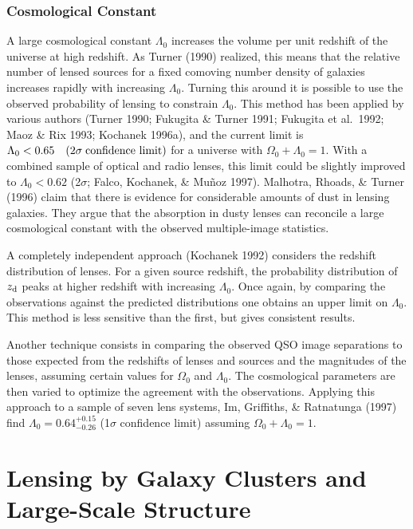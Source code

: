 \documentclass[a4paper,10pt]{article} %
\begin{document}
\subsubsection{Cosmological Constant}
\label{NB:subsubsect3.7.5}

A large cosmological constant $\Lambda_0$ increases the volume per
unit redshift of the universe at high redshift. As Turner (1990)
realized, this means that the relative number of lensed sources for a
fixed comoving number density of galaxies increases rapidly with
increasing $\Lambda_0$. Turning this around it is possible to use the
observed probability of lensing to constrain $\Lambda_0$. This method
has been applied by various authors (Turner 1990; Fukugita \& Turner
1991; Fukugita et al.\ 1992; Maoz \& Rix 1993; Kochanek 1996a), and
the current limit is $\Lambda_0<0.65\quad(2\sigma\;\hbox{confidence
limit})$ for a universe with $\Omega_0+\Lambda_0=1$. With a combined
sample of optical and radio lenses, this limit could be slightly
improved to $\Lambda_0<0.62$ (2$\sigma$; Falco, Kochanek, \& Mu\~noz
1997). Malhotra, Rhoads, \& Turner (1996) claim that there is evidence
for considerable amounts of dust in lensing galaxies. They argue that
the absorption in dusty lenses can reconcile a large cosmological
constant with the observed multiple-image statistics.

A completely independent approach (Kochanek 1992) considers the
redshift distribution of lenses. For a given source redshift, the
probability distribution of $z_{\rm d}$ peaks at higher redshift with
increasing $\Lambda_0$. Once again, by comparing the observations
against the predicted distributions one obtains an upper limit on
$\Lambda_0$. This method is less sensitive than the first, but gives
consistent results.

Another technique consists in comparing the observed QSO image
separations to those expected from the redshifts of lenses and sources
and the magnitudes of the lenses, assuming certain values for
$\Omega_0$ and $\Lambda_0$. The cosmological parameters are then
varied to optimize the agreement with the observations. Applying this
approach to a sample of seven lens systems, Im, Griffiths, \&
Ratnatunga (1997) find $\Lambda_0=0.64^{+0.15}_{-0.26}$ (1$\sigma$
confidence limit) assuming $\Omega_0+\Lambda_0=1$.

\section{Lensing by Galaxy Clusters and Large-Scale Structure}
\label{NB:sect4}
\end{document}
